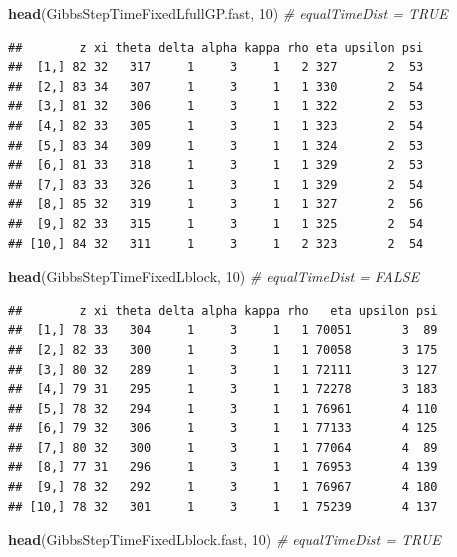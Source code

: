 \documentclass[
]{article}
\newenvironment{Shaded}{\begin{snugshade}}{\end{snugshade}}
\newcommand{\CommentTok}[1]{\textcolor[rgb]{0.56,0.35,0.01}{\textit{#1}}}
\newcommand{\DecValTok}[1]{\textcolor[rgb]{0.00,0.00,0.81}{#1}}
\newcommand{\FunctionTok}[1]{\textcolor[rgb]{0.13,0.29,0.53}{\textbf{#1}}}
\newcommand{\NormalTok}[1]{#1}
\begin{document}
\begin{Shaded}
\begin{Highlighting}[]
\FunctionTok{head}\NormalTok{(GibbsStepTimeFixedLfullGP.fast, }\DecValTok{10}\NormalTok{) }\CommentTok{\# equalTimeDist = TRUE}
\end{Highlighting}
\end{Shaded}

\begin{verbatim}
##        z xi theta delta alpha kappa rho eta upsilon psi
##  [1,] 82 32   317     1     3     1   2 327       2  53
##  [2,] 83 34   307     1     3     1   1 330       2  54
##  [3,] 81 32   306     1     3     1   1 322       2  53
##  [4,] 82 33   305     1     3     1   1 323       2  54
##  [5,] 83 34   309     1     3     1   1 324       2  53
##  [6,] 81 33   318     1     3     1   1 329       2  53
##  [7,] 83 33   326     1     3     1   1 329       2  54
##  [8,] 85 32   319     1     3     1   1 327       2  56
##  [9,] 82 33   315     1     3     1   1 325       2  54
## [10,] 84 32   311     1     3     1   2 323       2  54
\end{verbatim}

\begin{Shaded}
\begin{Highlighting}[]
\FunctionTok{head}\NormalTok{(GibbsStepTimeFixedLblock, }\DecValTok{10}\NormalTok{)       }\CommentTok{\# equalTimeDist = FALSE}
\end{Highlighting}
\end{Shaded}

\begin{verbatim}
##        z xi theta delta alpha kappa rho   eta upsilon psi
##  [1,] 78 33   304     1     3     1   1 70051       3  89
##  [2,] 82 33   300     1     3     1   1 70058       3 175
##  [3,] 80 32   289     1     3     1   1 72111       3 127
##  [4,] 79 31   295     1     3     1   1 72278       3 183
##  [5,] 78 32   294     1     3     1   1 76961       4 110
##  [6,] 79 32   306     1     3     1   1 77133       4 125
##  [7,] 80 32   300     1     3     1   1 77064       4  89
##  [8,] 77 31   296     1     3     1   1 76953       4 139
##  [9,] 78 32   292     1     3     1   1 76967       4 180
## [10,] 78 32   301     1     3     1   1 75239       4 137
\end{verbatim}

\begin{Shaded}
\begin{Highlighting}[]
\FunctionTok{head}\NormalTok{(GibbsStepTimeFixedLblock.fast, }\DecValTok{10}\NormalTok{)  }\CommentTok{\# equalTimeDist = TRUE}
\end{Highlighting}
\end{Shaded}
\end{document}
